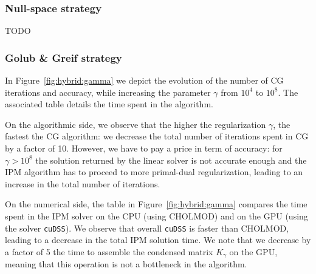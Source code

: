 \begin{table}[!ht]
  \centering
  \caption{Comparing the performance of cuDSS with CHOLMOD.
    The matrix $K_\gamma$ is symmetric positive definite, with
    a size $n = 85,568$. The matrix is super sparse: the number of nonzeroes is $1,057,200$ ($0.01$\%).
    \label{tab:linsol:time}
  }
\end{table}



\subsubsection{Null-space strategy}
TODO

\subsubsection{Golub \& Greif strategy}
In Figure~\ref{fig:hybrid:gamma} we depict the evolution of the number
of CG iterations and accuracy, while increasing the parameter $\gamma$
from $10^4$ to $10^8$. The associated table details the time spent
in the algorithm.

On the algorithmic side, we observe that the higher the regularization $\gamma$,
the fastest the CG algorithm: we decrease the total number of iterations
spent in CG by a factor of 10. However, we have to pay a price in term
of accuracy: for $\gamma > 10^8$ the solution returned by the linear solver
is not accurate enough and the IPM algorithm has to proceed to more
primal-dual regularization, leading to an increase in the total number of iterations.

On the numerical side, the table in Figure~\ref{fig:hybrid:gamma} compares
the time spent in the IPM solver on the CPU (using CHOLMOD) and on the GPU
(using the solver {\tt cuDSS}). We observe that overall {\tt cuDSS} is
faster than CHOLMOD, leading to a decrease in the total IPM solution time.
We note that we decrease by a factor of 5 the time to assemble the condensed
matrix $K_\gamma$ on the GPU, meaning that this operation is not a bottleneck in
the algorithm.


